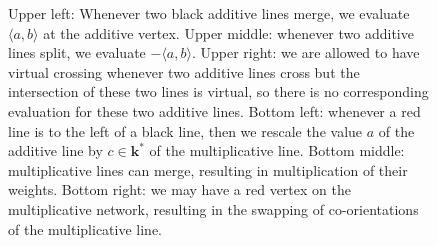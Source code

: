 \begin{figure}
\begin{center}
\end{center}
    \caption{Upper left: Whenever two black additive lines merge, we evaluate $\langle a,b\rangle$ at the additive vertex. Upper middle: whenever two additive lines split, we evaluate $-\langle a,b\rangle$. Upper right: we are allowed to have virtual crossing whenever two additive lines cross but the intersection of these two lines is virtual, so there is no corresponding evaluation for these two additive lines. Bottom left: whenever a red line is to the left of a black line, then we rescale the value $a$ of the additive line by $c\in \mathbf{k}^*$ of the multiplicative line.  Bottom middle: multiplicative lines can merge, resulting in multiplication of their weights. Bottom right: we may have a red vertex on the multiplicative network, resulting in the swapping of co-orientations of the multiplicative line.}
    \label{fig_1001}
\end{figure}